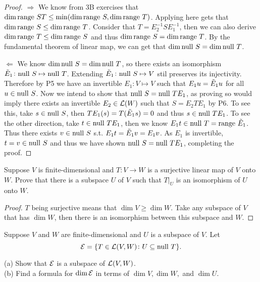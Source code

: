 \documentclass{extarticle}
\begin{document}
\begin{proof}
\(\Rightarrow\) We know from 3B exercises that \(\dim \text{range } ST \leq \min (\dim \text{range } S, \dim \text{range } T)\). 
Applying  here gets that \(\dim \text{range } S \leq \dim \text{range } T\). Consider that \(T = E^{-1}_2 S E_1^{-1}\), 
then we can also derive \(\dim \text{range } T \leq \dim \text{range } S\) and thus \(\dim \text{range } S = \dim \text{range } T\). 
By the fundamental theorem of linear map, we can get that \(\dim \text{null } S = \dim \text{null } T\). 

\(\Leftarrow\) We know \(\dim \text{null } S = \dim \text{null } T\), so there exists an isomorphism \(\Tilde{E}_1 \colon 
\text{null } S \mapsto \text{null } T\). Extending \(\Tilde{E}_1 \colon \text{null } S \mapsto V\) stil preserves its injectivity. Therefore 
by P5 we have an invertible \(E_1 \colon V \mapsto V\) such that \(E_1 u = \Tilde{E}_1 u\) for all \(u \in \text{null } S\). 
Now we intend to show that \(\text{null } S = \text{null } T E_1\), as proving so would imply there exists an invertible 
\(E_2 \in \mathcal{L}(W)\) such that \(S=E_2 T E_1\) by P6. To see this, take \(s \in \text{null } S\), then 
\(TE_1(s) = T(\Tilde{E}_1 s) = 0\) and thus \(s \in \text{null } TE_1\). To see the other direction, take 
\(t \in \text{null } T E_1\), then we know \(E_1 t \in \text{null } T = \text{range } \Tilde{E}_1\). Thus there exists \(v \in \text{null } S\)
s.t. \(E_1 t = \Tilde{E}_1 v = E_1 v\). As \(E_1\) is invertible, \(t = v \in \text{null } S\) and thus we have shown 
\(\text{null } S = \text{null } TE_1\), completing the proof.   
\end{proof}


\begin{problem}{9}
    Suppose \(V\) is finite-dimensional and \(T \colon V \to W\) is a surjective linear map of \(V\)
    onto \(W\). Prove that there is a subspace \(U\) of \(V\) such that \(T |_U\) is an isomorphism 
    of \(U\) onto \(W\).
\end{problem}

\begin{proof}
\(T\) being surjective means that \(\dim V \geq \dim W\). Take any subspace of \(V\) that has 
\(\dim W\), then there is an isomorphism between this subspace and \(W\). 
\end{proof}

\begin{problem}{10}
    Suppose \(V\) and \(W\) are finite-dimensional and \(U\) is a subspace of \(V\). Let 
    \[\mathcal{E} = \{T \in \mathcal{L}(V, W) \colon U \subseteq \text{null } T\}.\]

    (a) Show that \(\mathcal{E}\) is a subspace of \(\mathcal{L}(V, W)\). \\ 
    (b) Find a formula for \(\dim \mathcal{E}\) in terms of \(\dim V, \dim W,\) and \(\dim U\). 
\end{problem}
\end{document}
